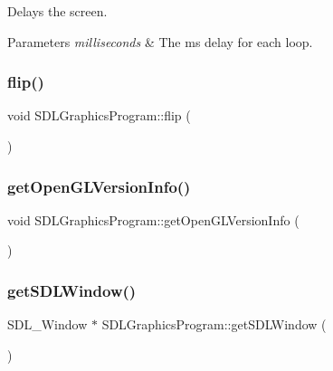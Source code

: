 Delays the screen. 


\begin{DoxyParams}{Parameters}
{\em milliseconds} & The ms delay for each loop. \\
\hline
\end{DoxyParams}
\mbox{\label{class_s_d_l_graphics_program_a1b2040042b2fc4bda09f365d7885e9a3}} 
\subsubsection{\texorpdfstring{flip()}{flip()}}
{\footnotesize\ttfamily void S\+D\+L\+Graphics\+Program\+::flip (\begin{DoxyParamCaption}{ }\end{DoxyParamCaption})}

\mbox{\label{class_s_d_l_graphics_program_a7710ed9e68081310be98527fa45fd5dd}} 
\subsubsection{\texorpdfstring{getOpenGLVersionInfo()}{getOpenGLVersionInfo()}}
{\footnotesize\ttfamily void S\+D\+L\+Graphics\+Program\+::get\+Open\+G\+L\+Version\+Info (\begin{DoxyParamCaption}{ }\end{DoxyParamCaption})}

\mbox{\label{class_s_d_l_graphics_program_a42e9554ec5b497551530bd5a8ca9585f}} 
\subsubsection{\texorpdfstring{getSDLWindow()}{getSDLWindow()}}
{\footnotesize\ttfamily S\+D\+L\+\_\+\+Window $\ast$ S\+D\+L\+Graphics\+Program\+::get\+S\+D\+L\+Window (\begin{DoxyParamCaption}{ }\end{DoxyParamCaption})}



